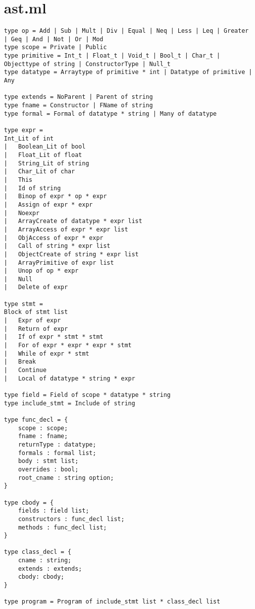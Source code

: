 \section{ast.ml}
\begin{verbatim}
type op = Add | Sub | Mult | Div | Equal | Neq | Less | Leq | Greater | Geq | And | Not | Or | Mod
type scope = Private | Public
type primitive = Int_t | Float_t | Void_t | Bool_t | Char_t | Objecttype of string | ConstructorType | Null_t
type datatype = Arraytype of primitive * int | Datatype of primitive | Any

type extends = NoParent | Parent of string
type fname = Constructor | FName of string
type formal = Formal of datatype * string | Many of datatype

type expr =
Int_Lit of int
| 	Boolean_Lit of bool
| 	Float_Lit of float
| 	String_Lit of string
| 	Char_Lit of char
| 	This
| 	Id of string
| 	Binop of expr * op * expr
| 	Assign of expr * expr
| 	Noexpr
| 	ArrayCreate of datatype * expr list
| 	ArrayAccess of expr * expr list
| 	ObjAccess of expr * expr
| 	Call of string * expr list  
|   ObjectCreate of string * expr list
| 	ArrayPrimitive of expr list
|  	Unop of op * expr
| 	Null
| 	Delete of expr

type stmt =
Block of stmt list
| 	Expr of expr
| 	Return of expr
| 	If of expr * stmt * stmt
| 	For of expr * expr * expr * stmt
| 	While of expr * stmt
|  	Break
|   Continue
|   Local of datatype * string * expr

type field = Field of scope * datatype * string
type include_stmt = Include of string

type func_decl = {
	scope : scope;
	fname : fname;
	returnType : datatype;
	formals : formal list;
	body : stmt list;
	overrides : bool;
	root_cname : string option;
}

type cbody = {
	fields : field list;
	constructors : func_decl list;
	methods : func_decl list;
}

type class_decl = {
	cname : string;
	extends : extends;
	cbody: cbody;
}

type program = Program of include_stmt list * class_decl list
\end{verbatim}	